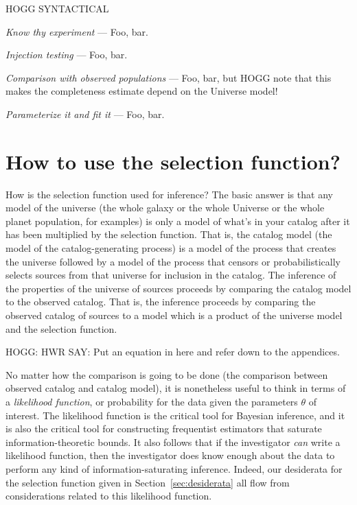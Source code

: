 \documentclass[modern]{aastex62}
\newcommand{\sectionname}{Section}
\renewcommand{\paragraph}[1]{\medskip\noindent\textit{#1} ---}
\begin{document}
HOGG SYNTACTICAL

\paragraph{Know thy experiment}
Foo, bar.

\paragraph{Injection testing}
Foo, bar.

\paragraph{Comparison with observed populations}
Foo, bar, but HOGG note that this makes the completeness estimate depend
on the Universe model!

\paragraph{Parameterize it and fit it}
Foo, bar.

\section{How to use the selection function?}\label{sec:howto}

How is the selection function used for inference?
The basic answer is that any model of the universe (the whole galaxy
or the whole Universe or the whole planet population, for examples)
is only a model of what's in your catalog after it has been multiplied
by the selection function.
That is, the catalog model (the model of the catalog-generating process)
is a model of the process that
creates the universe followed by a model of the process that censors or
probabilistically selects sources from that universe for inclusion in the catalog.
The inference of the properties of the universe of sources proceeds
by comparing the catalog model to the observed catalog.
That is, the inference  proceeds by comparing the observed catalog
of sources to a model which is a product of the universe model and the
selection function.

HOGG: HWR SAY: Put an equation in here and refer down to the appendices.

No matter how the comparison is going to be done (the comparison between
observed catalog and catalog model), it is nonetheless
useful to think in
terms of a \emph{likelihood function}, or probability for the data given
the parameters $\theta$ of interest.
The likelihood function is the critical tool for Bayesian inference, and
it is also the critical tool for constructing frequentist estimators that
saturate information-theoretic bounds.
It also follows that if the investigator \emph{can} write a likelihood
function, then the investigator does know enough about the data to perform
any kind of information-saturating inference.
Indeed, our desiderata for the selection function given in
\sectionname~\ref{sec:desiderata} all flow from considerations related
to this likelihood function.
\end{document}
